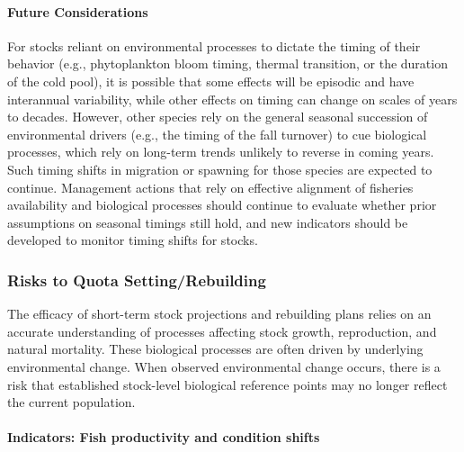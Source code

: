 \documentclass[
  10pt,
]{article}
\begin{document}
\hypertarget{future-considerations-1}{%
\paragraph{Future Considerations}\label{future-considerations-1}}

For stocks reliant on environmental processes to dictate the timing of their behavior (e.g., phytoplankton bloom timing, thermal transition, or the duration of the cold pool), it is possible that some effects will be episodic and have interannual variability, while other effects on timing can change on scales of years to decades. However, other species rely on the general seasonal succession of environmental drivers (e.g., the timing of the fall turnover) to cue biological processes, which rely on long-term trends unlikely to reverse in coming years. Such timing shifts in migration or spawning for those species are expected to continue. Management actions that rely on effective alignment of fisheries availability and biological processes should continue to evaluate whether prior assumptions on seasonal timings still hold, and new indicators should be developed to monitor timing shifts for stocks.

\hypertarget{risks-to-quota-settingrebuilding}{%
\subsubsection{Risks to Quota Setting/Rebuilding}\label{risks-to-quota-settingrebuilding}}

The efficacy of short-term stock projections and rebuilding plans relies on an accurate understanding of processes affecting stock growth, reproduction, and natural mortality. These biological processes are often driven by underlying environmental change. When observed environmental change occurs, there is a risk that established stock-level biological reference points may no longer reflect the current population.

\hypertarget{indicators-fish-productivity-and-condition-shifts}{%
\paragraph{Indicators: Fish productivity and condition shifts}\label{indicators-fish-productivity-and-condition-shifts}}
\end{document}
